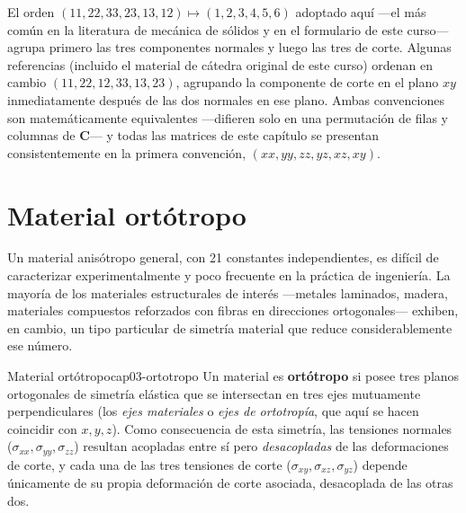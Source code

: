 \begin{observacion}
El orden $(11,22,33,23,13,12)\mapsto(1,2,3,4,5,6)$ adoptado aquí —el más común en la literatura de mecánica de sólidos y en el formulario de este curso— agrupa primero las tres componentes normales y luego las tres de corte. Algunas referencias (incluido el material de cátedra original de este curso) ordenan en cambio $(11,22,12,33,13,23)$, agrupando la componente de corte en el plano $xy$ inmediatamente después de las dos normales en ese plano. Ambas convenciones son matemáticamente equivalentes —difieren solo en una permutación de filas y columnas de $\bm C$— y todas las matrices de este capítulo se presentan consistentemente en la primera convención, $(xx,yy,zz,yz,xz,xy)$.
\end{observacion}

\section{Material ortótropo}
\label{sec:cap03-ortotropo}

Un material anisótropo general, con 21 constantes independientes, es difícil de caracterizar experimentalmente y poco frecuente en la práctica de ingeniería. La mayoría de los materiales estructurales de interés —metales laminados, madera, materiales compuestos reforzados con fibras en direcciones ortogonales— exhiben, en cambio, un tipo particular de simetría material que reduce considerablemente ese número.

\begin{definicion}{Material ortótropo}{cap03-ortotropo}
Un material es \textbf{ortótropo} si posee tres planos ortogonales de simetría elástica que se intersectan en tres ejes mutuamente perpendiculares (los \emph{ejes materiales} o \emph{ejes de ortotropía}, que aquí se hacen coincidir con $x,y,z$). Como consecuencia de esta simetría, las tensiones normales ($\sigma_{xx},\sigma_{yy},\sigma_{zz}$) resultan acopladas entre sí pero \emph{desacopladas} de las deformaciones de corte, y cada una de las tres tensiones de corte ($\sigma_{xy},\sigma_{xz},\sigma_{yz}$) depende únicamente de su propia deformación de corte asociada, desacoplada de las otras dos.
\end{definicion}

